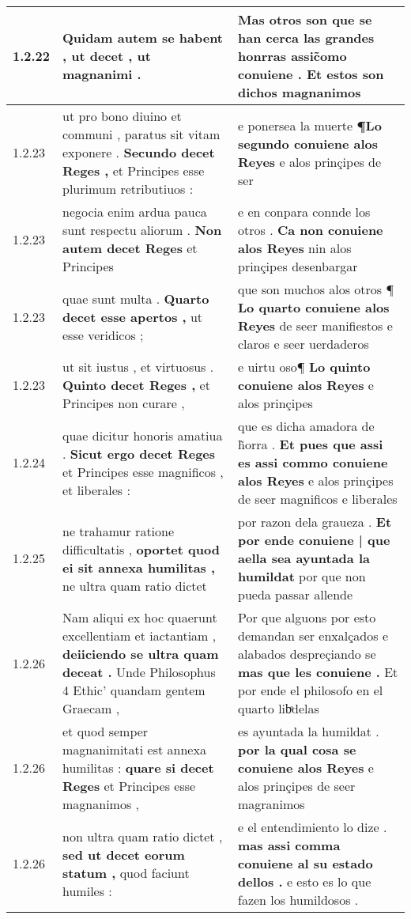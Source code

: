 \begin{tabular}{|p{1cm}|p{6.5cm}|p{6.5cm}|}
1.2.22 & Quidam autem se habent , \textbf{ ut decet , } ut magnanimi . & Mas otros son que se han cerca las grandes honrras \textbf{ assic̃omo conuiene . } Et estos son dichos magnanimos \\\hline
1.2.23 & ut pro bono diuino et communi , paratus sit vitam exponere . \textbf{ Secundo decet Reges , } et Principes esse plurimum retributiuos : & e ponersea la muerte \textbf{ ¶Lo segundo conuiene alos Reyes } e alos prinçipes de ser \\\hline
1.2.23 & negocia enim ardua pauca sunt respectu aliorum . \textbf{ Non autem decet Reges } et Principes & e en conpara connde los otros . \textbf{ Ca non conuiene alos Reyes } nin alos prinçipes desenbargar \\\hline
1.2.23 & quae sunt multa . \textbf{ Quarto decet esse apertos , } ut esse veridicos ; & que son muchos alos otros ¶ \textbf{ Lo quarto conuiene alos Reyes } de seer manifiestos e claros e seer uerdaderos \\\hline
1.2.23 & ut sit iustus , et virtuosus . \textbf{ Quinto decet Reges , } et Principes non curare , & e uirtu oso¶ \textbf{ Lo quinto conuiene alos Reyes } e alos prinçipes \\\hline
1.2.24 & quae dicitur honoris amatiua . \textbf{ Sicut ergo decet Reges } et Principes esse magnificos , et liberales : & que es dicha amadora de h̃orra . \textbf{ Et pues que assi es assi commo conuiene alos Reyes } e alos prinçipes de seer magnificos e liberales \\\hline
1.2.25 & ne trahamur ratione difficultatis , \textbf{ oportet quod ei sit annexa humilitas , } ne ultra quam ratio dictet & por razon dela graueza . \textbf{ Et por ende conuiene | que aella sea ayuntada la humildat } por que non pueda passar allende \\\hline
1.2.26 & Nam aliqui ex hoc quaerunt excellentiam et iactantiam , \textbf{ deiiciendo se ultra quam deceat . } Unde Philosophus 4 Ethic’ quandam gentem Graecam , & Por que alguons por esto demandan ser enxalçados e alabados despreçiando se \textbf{ mas que les conuiene . } Et por ende el philosofo en el quarto libͤdelas \\\hline
1.2.26 & et quod semper magnanimitati est annexa humilitas : \textbf{ quare si decet Reges } et Principes esse magnanimos , & es ayuntada la humildat . \textbf{ por la qual cosa se conuiene alos Reyes } e alos prinçipes de seer magranimos \\\hline
1.2.26 & non ultra quam ratio dictet , \textbf{ sed ut decet eorum statum , } quod faciunt humiles : & e el entendimiento lo dize . \textbf{ mas assi comma conuiene al su estado dellos . } e esto es lo que fazen los humildosos . \\\hline

\end{tabular}
